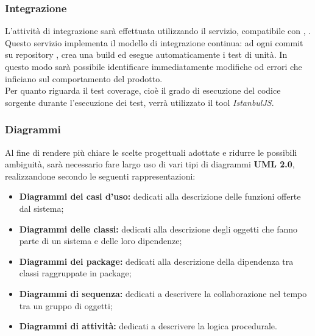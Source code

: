 \documentclass[NormeDiProgetto.tex]{subfiles}
\begin{document}
\subsubsection{Integrazione}
L'attività di integrazione sarà effettuata utilizzando il servizio, compatibile con , \textit{}.\\
Questo servizio implementa il modello di integrazione continua: ad ogni commit su repository ,  crea una build ed esegue automaticamente i test di unità. In questo modo sarà possibile identificare immediatamente modifiche od errori che inficiano sul comportamento del prodotto.\\
Per quanto riguarda il test coverage, cioè il grado di esecuzione del codice sorgente durante l'esecuzione dei test, verrà utilizzato il tool  \textit{IstanbulJS}. 
\subsubsection{Diagrammi}
Al fine di rendere più chiare le scelte progettuali adottate e
ridurre le possibili ambiguità, sarà necessario fare largo uso di vari tipi di diagrammi 
\textbf{UML 2.0}, realizzandone secondo le seguenti rappresentazioni:
\begin{itemize}
	\item \textbf{Diagrammi dei casi d'uso:} dedicati alla descrizione delle funzioni offerte dal sistema;
	\item \textbf{Diagrammi delle classi:} dedicati alla descrizione degli oggetti che fanno parte di un sistema e delle loro dipendenze;
	\item \textbf{Diagrammi dei package:} dedicati alla descrizione della dipendenza tra classi raggruppate in package;
	\item \textbf{Diagrammi di sequenza:} dedicati a descrivere la collaborazione nel tempo tra un gruppo di oggetti;
	\item \textbf{Diagrammi di attività:} dedicati a descrivere la logica procedurale.
\end{itemize}
\end{document}
